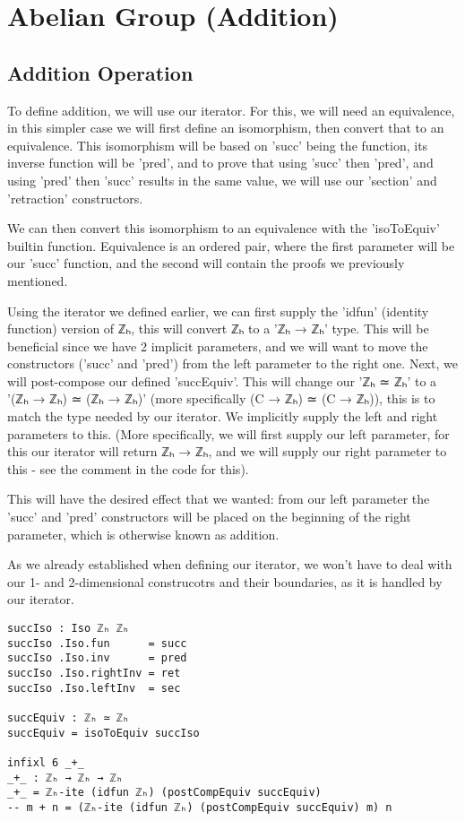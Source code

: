 \chapter{Abelian Group (Addition)}
\label{ch:abgroup}

\section{Addition Operation}
To define addition, we will use our iterator. For this, we will need an equivalence, in this simpler case we will first define an isomorphism, then convert that to an equivalence.
This isomorphism will be based on 'succ' being the function, its inverse function will be 'pred', and to prove that using 'succ' then 'pred', and using 'pred' then 'succ' results in the same value, we will use our 'section' and 'retraction' constructors.

We can then convert this isomorphism to an equivalence with the 'isoToEquiv' builtin function. Equivalence is an ordered pair, where the first parameter will be our 'succ' function, and the second will contain the proofs we previously mentioned.

Using the iterator we defined earlier, we can first supply the 'idfun' (identity function) version of ℤₕ, this will convert ℤₕ to a 'ℤₕ → ℤₕ' type. This will be beneficial since we have 2 implicit parameters, and we will want to move the constructors ('succ' and 'pred') from the left parameter to the right one. Next, we will post-compose our defined 'succEquiv'. This will change our 'ℤₕ ≃ ℤₕ' to a '(ℤₕ → ℤₕ) ≃ (ℤₕ → ℤₕ)' (more specifically (C → ℤₕ) ≃ (C → ℤₕ)), this is to match the type needed by our iterator. We implicitly supply the left and right parameters to this. (More specifically, we will first supply our left parameter, for this our iterator will return ℤₕ → ℤₕ, and we will supply our right parameter to this - see the comment in the code for this).

This will have the desired effect that we wanted: from our left parameter the 'succ' and 'pred' constructors will be placed on the beginning of the right parameter, which is otherwise known as addition.

As we already established when defining our iterator, we won't have to deal with our 1- and 2-dimensional construcotrs and their boundaries, as it is handled by our iterator.

\begin{verbatim}
succIso : Iso ℤₕ ℤₕ
succIso .Iso.fun      = succ
succIso .Iso.inv      = pred
succIso .Iso.rightInv = ret
succIso .Iso.leftInv  = sec

succEquiv : ℤₕ ≃ ℤₕ
succEquiv = isoToEquiv succIso

infixl 6 _+_
_+_ : ℤₕ → ℤₕ → ℤₕ
_+_ = ℤₕ-ite (idfun ℤₕ) (postCompEquiv succEquiv)
-- m + n = (ℤₕ-ite (idfun ℤₕ) (postCompEquiv succEquiv) m) n
\end{verbatim}

